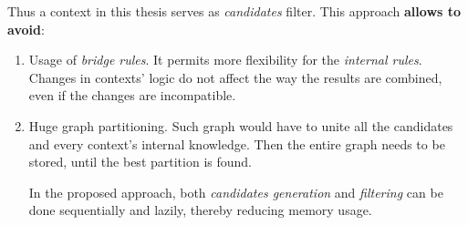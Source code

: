 \documentclass[ThesisDoc]{subfiles}
\begin{document}
Thus a context in this thesis serves as \emph{candidates} filter. This approach
\textbf{allows to avoid}:
\begin{enumerate}
  \item Usage of \emph{bridge rules}. It permits more flexibility for
    the \emph{internal rules}. Changes in contexts' logic do not affect the way
    the results are combined, even if the changes are incompatible.
  \item Huge graph partitioning. Such graph would have to unite all the
    candidates and every context's internal knowledge. Then the entire graph
    needs to be stored, until the best partition is found.

    In the proposed approach, both \emph{candidates generation} and
    \emph{filtering} can be done sequentially and lazily,
    thereby reducing memory usage.

\end{enumerate}
\end{document}
